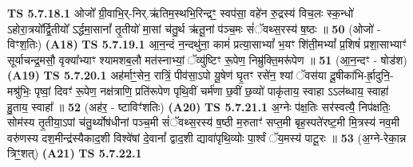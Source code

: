 \documentclass[17pt]{extarticle}
\begin{document}
                                        \textbf{ TS 5.7.18.1} \newline
                  ओजो᳚ ग्री॒वाभि॒र्-निर्.ऋ॑तिम॒स्थभि॒रिन्द्रꣳ॒॒ स्वप॑सा॒ वहे॑न रु॒द्रस्य॑ विच॒लः स्क॒न्धो॑ ऽहोरा॒त्रयो᳚र्द्वि॒तीयो᳚ ऽर्द्धमा॒सानां᳚ तृ॒तीयो॑ मा॒सां च॑तु॒र्थ ऋ॑तू॒नां प॑ञ्च॒मः सं॑ॅवथ्स॒रस्य॑ ष॒ष्ठः ॥ \textbf{  50} \newline
                  \newline
                      (ओजो॑ - विꣳश॒तिः)  \textbf{(A18)} \newline \newline
                                        \textbf{ TS 5.7.19.1} \newline
                  आ॒न॒न्दं न॒न्दथु॑ना॒ कामं॑ प्रत्या॒साभ्यां᳚ भ॒यꣳ शि॑ती॒मभ्यां᳚ प्र॒शिषं॑ प्रशा॒साभ्याꣳ॑ सूर्याचन्द्र॒मसौ॒ वृक्या᳚भ्याꣳ श्यामशब॒लौ मत॑स्नाभ्यां॒ ॅव्यु॑ष्टिꣳ रू॒पेण॒ निम्रु॑क्ति॒मरू॑पेण ॥ \textbf{  51 } \newline
                  \newline
                      (आ॒न॒न्दꣳ - षोड॑श)  \textbf{(A19)} \newline \newline
                                        \textbf{ TS 5.7.20.1} \newline
                  अह॑र्माꣳ॒॒सेन॒ रात्रिं॒ पीव॑सा॒ऽपो यू॒षेण॑ घृ॒तꣳ रसे॑न॒ श्यां ॅवस॑या दू॒षीका॑भि-र्ह्रा॒दुनि॒-मश्रु॑भिः॒ पृष्वां॒ दिवꣳ॑ रू॒पेण॒ नक्ष॑त्राणि॒ प्रति॑रूपेण पृथि॒वीं चर्म॑णा छ॒वीं छ॒व्यो॑ पाकृ॑ताय॒ स्वाहा ऽऽल॑ब्धाय॒ स्वाहा॑ हु॒ताय॒ स्वाहा᳚ ॥ \textbf{  52 } \newline
                  \newline
                      (अह॑र॒ - ष्टाविꣳ॑शतिः)  \textbf{(A20)} \newline \newline
                                        \textbf{ TS 5.7.21.1} \newline
                  अ॒ग्नेः प॑क्ष॒तिः सर॑स्वत्यै॒ निप॑क्षतिः॒ सोम॑स्य तृ॒तीया॒ऽपां च॑तु॒र्थ्योष॑धीनां पञ्च॒मी सं॑ॅवथ्स॒रस्य॑ ष॒ष्ठी म॒रुताꣳ॑ सप्त॒मी बृह॒स्पते॑रष्ट॒मी मि॒त्रस्य॑ नव॒मी वरु॑णस्य दश॒मीन्द्र॑स्यैकाद॒शी विश्वे॑षां दे॒वानां᳚ द्वाद॒शी द्यावा॑पृथि॒व्योः पा॒र्श्वं ॅय॒मस्य॑ पाटू॒रः ॥ \textbf{  53 } \newline
                  \newline
                      (अ॒ग्ने-रेका॒न्न त्रिꣳ॒॒शत्)  \textbf{(A21)} \newline \newline
                                        \textbf{ TS 5.7.22.1} \newline
\end{document}
